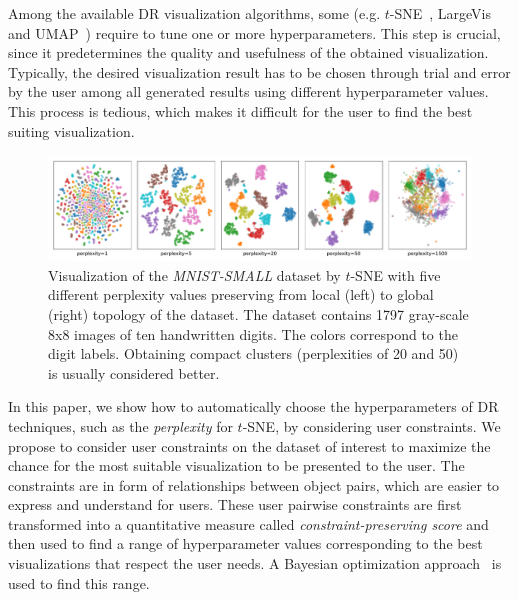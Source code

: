 Among the available DR visualization algorithms, some (e.g. $t$-SNE~\cite{maaten2008tsne}, LargeVis~\cite{tang2016visualizing} and UMAP~\cite{mcinnes2018umap}) require to tune one or more hyperparameters. This step is crucial, since it predetermines the quality and usefulness of the obtained visualization. Typically, the desired visualization result has to be chosen through trial and error by the user among all generated results using different hyperparameter values. This process is tedious, which makes it difficult for the user to find the best suiting visualization.

\begin{figure}[!ht]
  \centering
  \includegraphics[width=\linewidth]{figures/MNIST-SMALL_examples}
  \caption{Visualization of the \emph{MNIST-SMALL} dataset by $t$-SNE with five different perplexity values preserving from local (left) to global (right) topology of the dataset. The dataset contains 1797 gray-scale 8x8 images of ten handwritten digits. The colors correspond to the digit labels. Obtaining compact clusters (perplexities of 20 and 50) is usually considered better.}
  \label{fig:mnist_perps}
\end{figure}

In this paper, we show how to automatically choose the hyperparameters of DR techniques, such as the {\it perplexity} for $t$-SNE, by considering user constraints. We propose to consider user constraints on the dataset of interest to maximize the chance for the most suitable visualization to be presented to the user. The constraints are in form of relationships between object pairs, which are easier to express and understand for users. These user pairwise constraints are first transformed into a quantitative measure called \emph{constraint-preserving score} and then used to find a range of hyperparameter values corresponding to the best visualizations that respect the user needs. A Bayesian optimization approach~\cite{mockus1978application, brochu2010tutorial} is used to find this range.

